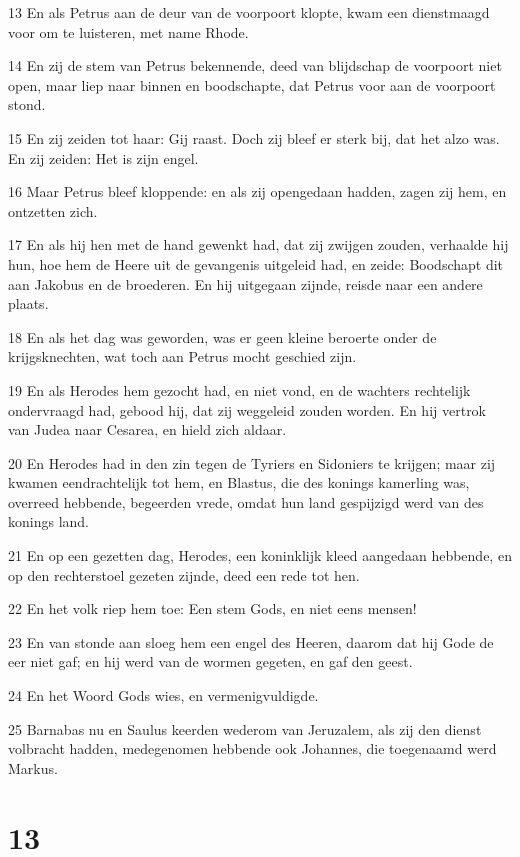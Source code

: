 \par 13 En als Petrus aan de deur van de voorpoort klopte, kwam een dienstmaagd voor om te luisteren, met name Rhode.
\par 14 En zij de stem van Petrus bekennende, deed van blijdschap de voorpoort niet open, maar liep naar binnen en boodschapte, dat Petrus voor aan de voorpoort stond.
\par 15 En zij zeiden tot haar: Gij raast. Doch zij bleef er sterk bij, dat het alzo was. En zij zeiden: Het is zijn engel.
\par 16 Maar Petrus bleef kloppende: en als zij opengedaan hadden, zagen zij hem, en ontzetten zich.
\par 17 En als hij hen met de hand gewenkt had, dat zij zwijgen zouden, verhaalde hij hun, hoe hem de Heere uit de gevangenis uitgeleid had, en zeide: Boodschapt dit aan Jakobus en de broederen. En hij uitgegaan zijnde, reisde naar een andere plaats.
\par 18 En als het dag was geworden, was er geen kleine beroerte onder de krijgsknechten, wat toch aan Petrus mocht geschied zijn.
\par 19 En als Herodes hem gezocht had, en niet vond, en de wachters rechtelijk ondervraagd had, gebood hij, dat zij weggeleid zouden worden. En hij vertrok van Judea naar Cesarea, en hield zich aldaar.
\par 20 En Herodes had in den zin tegen de Tyriers en Sidoniers te krijgen; maar zij kwamen eendrachtelijk tot hem, en Blastus, die des konings kamerling was, overreed hebbende, begeerden vrede, omdat hun land gespijzigd werd van des konings land.
\par 21 En op een gezetten dag, Herodes, een koninklijk kleed aangedaan hebbende, en op den rechterstoel gezeten zijnde, deed een rede tot hen.
\par 22 En het volk riep hem toe: Een stem Gods, en niet eens mensen!
\par 23 En van stonde aan sloeg hem een engel des Heeren, daarom dat hij Gode de eer niet gaf; en hij werd van de wormen gegeten, en gaf den geest.
\par 24 En het Woord Gods wies, en vermenigvuldigde.
\par 25 Barnabas nu en Saulus keerden wederom van Jeruzalem, als zij den dienst volbracht hadden, medegenomen hebbende ook Johannes, die toegenaamd werd Markus.

\chapter{13}

